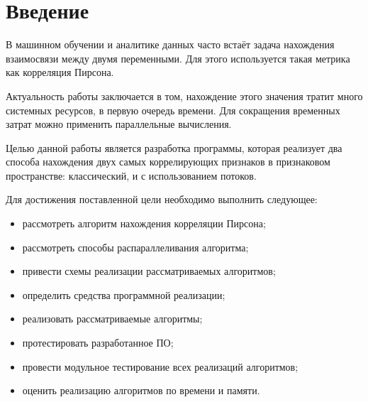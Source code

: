 \newpage
{}

\chapter*{Введение}
В машинном обучении и аналитике данных часто встаёт задача нахождения взаимосвязи между двумя переменными.
Для этого используется такая метрика как корреляция Пирсона.

Актуальность работы заключается в том, нахождение этого значения тратит много системных ресурсов, в первую очередь времени.
Для сокращения временных затрат можно применить параллельные вычисления.

Целью данной работы является разработка программы, которая реализует два способа нахождения двух самых коррелирующих
признаков в признаковом пространстве: классический, и с использованием потоков.

Для достижения поставленной цели необходимо выполнить следующее:
\begin{itemize}
	\item рассмотреть алгоритм нахождения корреляции Пирсона;
	\item рассмотреть способы распараллеливания алгоритма;
	\item привести схемы реализации рассматриваемых алгоритмов;
	\item определить средства программной реализации;
	\item реализовать рассматриваемые алгоритмы;
	\item протестировать разработанное ПО;
	\item провести модульное тестирование всех реализаций алгоритмов;
	\item оценить реализацию алгоритмов по времени и памяти.
\end{itemize}